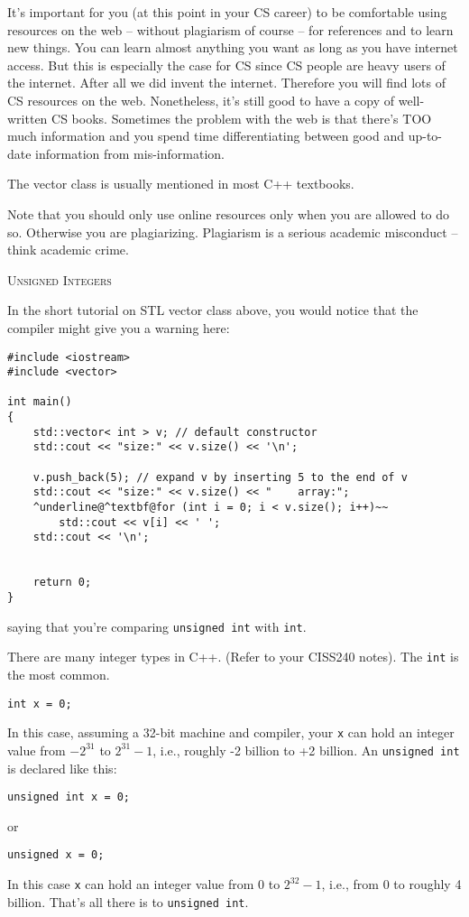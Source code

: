It's important for you (at this point in your CS career) to be 
comfortable using resources on the web – without plagiarism of 
course – for references and to learn new things. You can learn 
almost anything you want as long as you have internet access. 
But this is especially the case for CS since CS people are heavy 
users of the internet. After all we did invent the internet. 
Therefore you will find lots of CS resources on the web. Nonetheless, 
it's still good to have a copy of well-written CS books. Sometimes 
the problem with the web is that there's TOO much information and 
you spend time differentiating between good and up-to-date 
information from mis-information.

The vector class is usually mentioned in most C++ textbooks.

Note that you should only use online resources only when you
are allowed to do so.
Otherwise you are plagiarizing.
Plagiarism is a serious academic misconduct -- think academic crime.


\newpage
\textsc{Unsigned Integers}

In the short tutorial on STL vector class above, you would notice 
that the compiler might give you a warning here:

\begin{Verbatim}[frame=single, commandchars=\^\@\~, fontsize=\footnotesize]
#include <iostream>
#include <vector>

int main()
{
    std::vector< int > v; // default constructor
    std::cout << "size:" << v.size() << '\n';
    
    v.push_back(5); // expand v by inserting 5 to the end of v
    std::cout << "size:" << v.size() << "    array:";
    ^underline@^textbf@for (int i = 0; i < v.size(); i++)~~
        std::cout << v[i] << ' ';
    std::cout << '\n';


    return 0;
}
\end{Verbatim}

saying that you're comparing \verb!unsigned int! with \verb!int!.

There are many integer types in C++. (Refer to your CISS240 notes). 
The \verb!int! is the most common. 
\begin{Verbatim}[frame=single,fontsize=\footnotesize]
int x = 0;
\end{Verbatim}
In this case, assuming a 32-bit machine and compiler, your \verb!x! 
can hold an integer value from $-2^{31}$ to $2^{31} - 1$, i.e., roughly 
-2 billion to +2 billion. An \verb!unsigned int! is declared like this:
\begin{Verbatim}[frame=single,fontsize=\footnotesize]
unsigned int x = 0;
\end{Verbatim}
or 
\begin{Verbatim}[frame=single,fontsize=\footnotesize]
unsigned x = 0;
\end{Verbatim}
In this case \verb!x! can hold an integer value from 0 to $2^{32} - 1$, 
i.e., from 0 to roughly 4 billion. That's all there is to 
\verb!unsigned int!.

